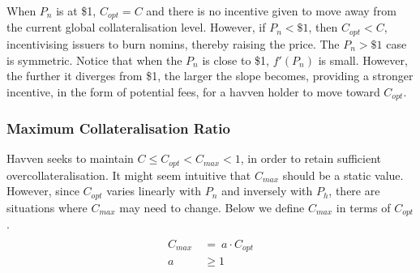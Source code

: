 \begin{center}
\end{center}

\noindent When $P_n$ is at \$1, $C_{opt} = C$ and there is no incentive given to move away from the current global collateralisation level. However, if $P_n < \$1$, then $C_{opt} < C$, incentivising issuers to burn nomins, thereby raising the price. The $P_n > \$1$ case is symmetric. Notice that when the $P_n$ is close to \$1, $ f'(P_n) $ is small. However, the further it diverges from \$1, the larger the slope becomes, providing a stronger incentive, in the form of potential fees, for a havven holder to move toward $C_{opt}$. \\

\newpage

\subsubsection{Maximum Collateralisation Ratio}

\noindent Havven seeks to maintain $C \leq C_{opt} < C_{max} < 1$, in order to retain sufficient overcollateralisation. It might seem intuitive that $C_{max}$ should be a static value. However, since $C_{opt}$ varies linearly with $P_n$ and inversely with $P_h$,  there are situations where $C_{max}$ may need to change. Below we define $C_{max}$ in terms of $C_{opt}$. \\

\begin{gather} \label{eq:maxcollateralisation}
\begin{align}
\begin{split}
C_{max} \ &= \ a \cdot C_{opt} \\ 
a & \geq 1 \\
\end{split}
\end{align}
\end{gather}

